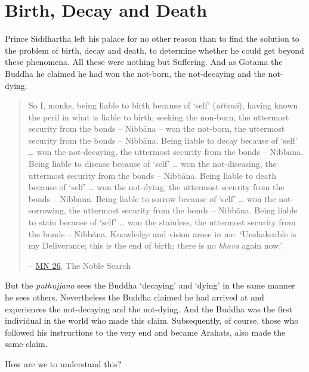 \chapter{Birth, Decay and Death}

Prince Siddhartha left his palace for no other reason than to find the solution to the problem of birth, decay and death, to determine whether he could get beyond these phenomena. All these were nothing but Suffering. And as Gotama the Buddha he claimed he had won the not-born, the not-decaying and the not-dying.

\begin{quote}
So I, monks, being liable to birth because of `self' (\textit{attanā}), having known the peril in what is liable to birth, seeking the non-born, the uttermost security from the bonds -- Nibbāna -- won the not-born, the uttermost security from the bonds -- Nibbāna. Being liable to decay because of `self' \ldots\hspace{0pt} won the not-decaying, the uttermost security from the bonds -- Nibbāna. Being liable to disease because of `self' \ldots\hspace{0pt} won the not-diseasing, the uttermost security from the bonds -- Nibbāna. Being liable to death because of `self' \ldots\hspace{0pt} won the not-dying, the uttermost security from the bonds -- Nibbāna. Being liable to sorrow because of `self' \ldots\hspace{0pt} won the not-sorrowing, the uttermost security from the bonds -- Nibbāna. Being liable to stain because of `self' \ldots\hspace{0pt} won the stainless, the uttermost security from the bonds -- Nibbāna. Knowledge and vision arose in me: `Unshakeable is my Deliverance; this is the end of birth; there is no \textit{bhava} again now.'

 -- \href{https://suttacentral.net/mn26/en/bodhi}{MN 26}, The Noble Search
\end{quote}

But the \textit{puthujjana} sees the Buddha `decaying' and `dying' in the same manner he sees others. Nevertheless the Buddha claimed he had arrived at and experiences the not-decaying and the not-dying. And the Buddha was the first individual in the world who made this claim. Subsequently, of course, those who followed his instructions to the very end and became Arahats, also made the same claim.

How are we to understand this?

